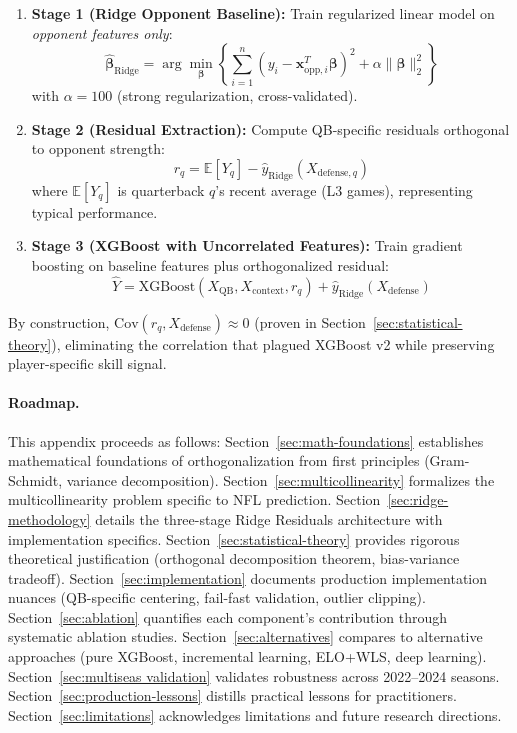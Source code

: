 \begin{enumerate}[itemsep=2pt,parsep=0pt]
    \item \textbf{Stage 1 (Ridge Opponent Baseline):} Train regularized linear model on \emph{opponent features only}:
    \begin{equation}
        \hat{\boldsymbol{\beta}}_{\text{Ridge}} = \arg\min_{\boldsymbol{\beta}} \left\{ \sum_{i=1}^{n} (y_i - \mathbf{x}_{\text{opp}, i}^T \boldsymbol{\beta})^2 + \alpha \|\boldsymbol{\beta}\|_2^2 \right\}
    \end{equation}
    with $\alpha = 100$ (strong regularization, cross-validated).

    \item \textbf{Stage 2 (Residual Extraction):} Compute QB-specific residuals orthogonal to opponent strength:
    \begin{equation}
        r_q = \mathbb{E}[Y_q] - \hat{y}_{\text{Ridge}}(X_{\text{defense}, q})
        \label{eq:residual-extraction}
    \end{equation}
    where $\mathbb{E}[Y_q]$ is quarterback $q$'s recent average (L3 games), representing typical performance.

    \item \textbf{Stage 3 (XGBoost with Uncorrelated Features):} Train gradient boosting on baseline features plus orthogonalized residual:
    \begin{equation}
        \hat{Y} = \text{XGBoost}(X_{\text{QB}}, X_{\text{context}}, r_q) + \hat{y}_{\text{Ridge}}(X_{\text{defense}})
    \end{equation}
\end{enumerate}

By construction, $\text{Cov}(r_q, X_{\text{defense}}) \approx 0$ (proven in Section~\ref{sec:statistical-theory}), eliminating the correlation that plagued XGBoost v2 while preserving player-specific skill signal.

\paragraph{Roadmap.}
This appendix proceeds as follows: Section~\ref{sec:math-foundations} establishes mathematical foundations of orthogonalization from first principles (Gram-Schmidt, variance decomposition). Section~\ref{sec:multicollinearity} formalizes the multicollinearity problem specific to NFL prediction. Section~\ref{sec:ridge-methodology} details the three-stage Ridge Residuals architecture with implementation specifics. Section~\ref{sec:statistical-theory} provides rigorous theoretical justification (orthogonal decomposition theorem, bias-variance tradeoff). Section~\ref{sec:implementation} documents production implementation nuances (QB-specific centering, fail-fast validation, outlier clipping). Section~\ref{sec:ablation} quantifies each component's contribution through systematic ablation studies. Section~\ref{sec:alternatives} compares to alternative approaches (pure XGBoost, incremental learning, ELO+WLS, deep learning). Section~\ref{sec:multiseas validation} validates robustness across 2022--2024 seasons. Section~\ref{sec:production-lessons} distills practical lessons for practitioners. Section~\ref{sec:limitations} acknowledges limitations and future research directions.

